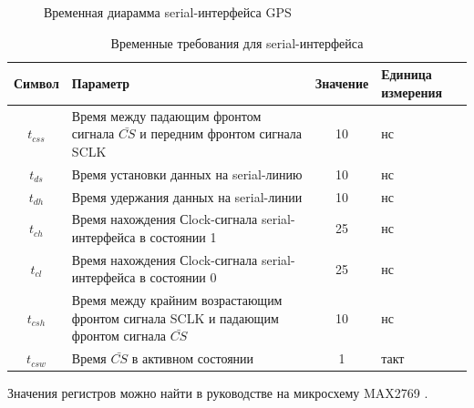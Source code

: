 \begin{figure}[h]
\caption{Временная диарамма serial-интерфейса GPS}
\label{pic:gps_serial}
\end{figure}

\begin{table}[h]
\caption{Временные требования для serial-интерфейса}
\label{tab:gps_serial}
\begin{tabular}{|c|p{250pt}|c|p{70pt}|}
 \hline  
  Символ & Параметр & Значение & Единица измерения  \\  
 \hline  
  $t_{css}$  & Время между падающим фронтом сигнала $\bar {CS}$ и передним фронтом сигнала SCLK	& 10 & нс  \\  
 \hline  
  $t_{ds}$   & Время установки данных на serial-линию	& 10 & нс \\  
 \hline  
  $t_{dh}$   & Время удержания данных на serial-линии	& 10 & нс \\  
 \hline  
  $t_{ch}$   & Время нахождения Сlock-сигнала serial-интерфейса в состоянии 1 & 25 & нс \\  
 \hline  
  $t_{cl}$   & Время нахождения Сlock-сигнала serial-интерфейса в состоянии 0 & 25 & нс \\  
 \hline  
  $t_{csh}$  & Время между крайним возрастающим фронтом сигнала SCLK и падающим фронтом сигнала $\bar {CS}$ & 10 & нс \\  
 \hline  
  $t_{csw}$  & Время $\bar {CS}$ в активном состоянии    & 1 & такт \\  
 \hline  
\end{tabular}
\end{table}

Значения регистров можно найти в руководстве на микросхему MAX2769 \cite{gps_max}.
\newpage
